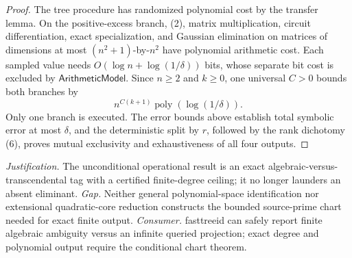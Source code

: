 \documentclass{article}
\begin{document}
\begin{proof}
The tree procedure has randomized polynomial cost by the transfer lemma.  On the positive-excess branch, (2), matrix multiplication, circuit differentiation, exact specialization, and Gaussian elimination on matrices of dimensions at most \((n^2+1)\)-by-\(n^2\) have polynomial arithmetic cost.  Each sampled value needs \(O(\log n+\log(1/\delta))\) bits, whose separate bit cost is excluded by \(\mathsf{ArithmeticModel}\).  Since \(n\geq2\) and \(k\geq0\), one universal \(C>0\) bounds both branches by
\[
 n^{C(k+1)}\operatorname{poly}(\log(1/\delta)).
\tag{12}
\]
Only one branch is executed.  The error bounds above establish total symbolic error at most \(\delta\), and the deterministic split by \(r\), followed by the rank dichotomy (6), proves mutual exclusivity and exhaustiveness of all four outputs.
\end{proof}
\par\smallskip\noindent \textit{Justification.} The unconditional operational result is an exact algebraic-versus-transcendental tag with a certified finite-degree ceiling; it no longer launders an absent eliminant. \textit{Gap.} Neither general polynomial-space identification nor extensional quadratic-core reduction constructs the bounded source-prime chart needed for exact finite output. \textit{Consumer.} fasttreeid can safely report finite algebraic ambiguity versus an infinite queried projection; exact degree and polynomial output require the conditional chart theorem.
\end{document}
